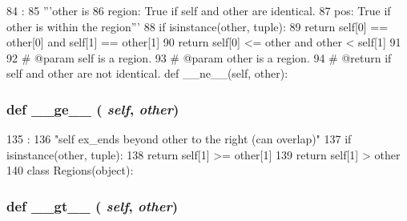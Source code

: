 \begin{DoxyCode}
84                            :
85         '''other is
86         region: True if self and other are identical.
87         pos: True if other is within the region'''
88         if isinstance(other, tuple):
89             return self[0] == other[0] and self[1] == other[1]
90         return self[0] <= other and other < self[1]
91 
92     # @param self is a region.
93     # @param other is a region.
94     # @return if self and other are not identical.
    def __ne__(self, other):
\end{DoxyCode}
\hypertarget{classm5_1_1util_1_1region_1_1Region_a3ee81c22a31860655ba6bf83ff5a8f36}{
\subsubsection[{\_\-\_\-ge\_\-\_\-}]{\setlength{\rightskip}{0pt plus 5cm}def \_\-\_\-ge\_\-\_\- ( {\em self}, \/   {\em other})}}
\label{classm5_1_1util_1_1region_1_1Region_a3ee81c22a31860655ba6bf83ff5a8f36}



\begin{DoxyCode}
135                            :
136         "self ex_ends beyond other to the right (can overlap)"
137         if isinstance(other, tuple):
138             return self[1] >= other[1]
139         return self[1] > other
140 
class Regions(object):
\end{DoxyCode}
\hypertarget{classm5_1_1util_1_1region_1_1Region_a728aec3eafa75fd847ce0bf8f954efde}{
\subsubsection[{\_\-\_\-gt\_\-\_\-}]{\setlength{\rightskip}{0pt plus 5cm}def \_\-\_\-gt\_\-\_\- ( {\em self}, \/   {\em other})}}
\label{classm5_1_1util_1_1region_1_1Region_a728aec3eafa75fd847ce0bf8f954efde}



